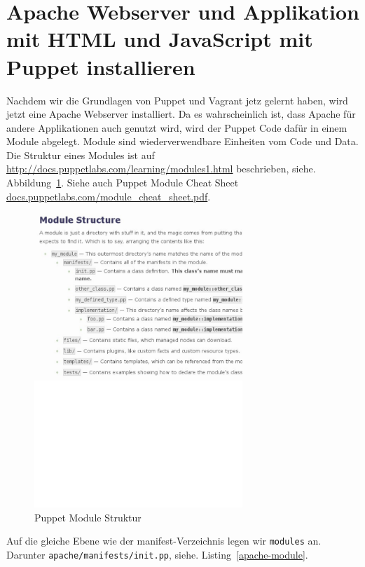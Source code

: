 \documentclass[12pt,a4paper,ngerman]{article}
\newcommand{\reffig}[1]{, siehe. Abbildung~\ref{#1}}
\newcommand{\reflst}[1]{, siehe. Listing~\ref{#1}}
\begin{document}
\section{Apache Webserver und Applikation mit HTML und JavaScript mit Puppet installieren}
Nachdem wir die Grundlagen von Puppet und Vagrant jetz gelernt haben, wird jetzt eine Apache Webserver installiert. Da es wahrscheinlich ist, dass Apache für andere Applikationen auch genutzt wird, wird der Puppet Code dafür in einem Module abgelegt. Module sind wiederverwendbare Einheiten vom Code und Data. Die Struktur eines Modules ist auf \url{http://docs.puppetlabs.com/learning/modules1.html} beschrieben\reffig{module_structure}. Siehe auch Puppet Module Cheat Sheet \url{docs.puppetlabs.com/module_cheat_sheet.pdf}.
\begin{figure}
  \begin{center}
    \includegraphics[width=0.7\textwidth]{images/module_structure.pdf}
  \end{center}
  \caption{Puppet Module Struktur}
  \label{module_structure}
\end{figure}


Auf die gleiche Ebene wie der manifest-Verzeichnis legen wir \lstinline$modules$ an. Darunter \lstinline$apache/manifests/init.pp$\reflst{apache-module}.
\begin{lstlisting}[caption=Verzeichnisstruktur für den apache-Module, label=apache-module]

\end{lstlisting}
\end{document}
